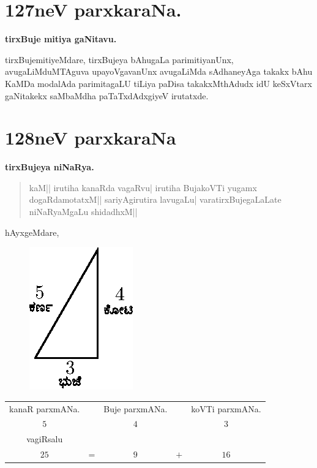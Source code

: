 \chapter{127neV parxkaraNa.}

\begin{center}
{\large\bf tirxBuje mitiya gaNitavu.}
\end{center}

tirxBujemitiyeMdare, tirxBujeya bAhugaLa parimitiyanUnx,
avugaLiMduMTAguva upayoVgavanUnx avu\-gaLiMda sAdhaneyAga takakx bAhu
KaMDa modalAda parimitagaLU tiLiya paDisa takakxMthAdudx idU keSxVtarx
gaNitakekx saMbaMdha paTaTxdAdxgiyeV irutatxde.


\chapter{128neV parxkaraNa}

\begin{center}
{\large\bf tirxBujeya niNaRya.}
\end{center}

\begin{verse}
kaM|| irutiha kanaRda vagaRvu| irutiha BujakoVTi yugamx
dogaRdamotatxM|| sariyAgirutira lavugaLu| varatirxBujegaLaLate
niNaRyaMgaLu shidadhxM||
\end{verse}

hAyxgeMdare,
\begin{figure}[H]
\centering
\includegraphics[scale=1.2]{figure/fig24.eps}
\end{figure}
\begin{center}
\begin{tabular}{c@{}c@{}c@{}c@{}c}
kanaR parxmANa. & & Buje parxmANa. & & koVTi parxmANa.\\
$5$ & & $4$ & & $3$\\
vagiRsalu & & \\
$25$ & = & $9$ & $+$ & $16$
\end{tabular}
\end{center}

